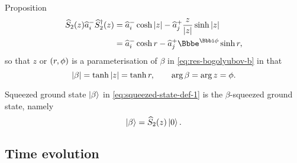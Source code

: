 \begin{namedthm}{Proposition}
\begin{align}
	\rfun{\widehat{S}_2}{z} \widehat{a}_i^- \rfun{\widehat{S}_2^\dagger}{z}
	&= \widehat{a}_i^-\cosh \vbr{z}
		- \widehat{a}_j^+ \frac{z}{\vbr{z}} \sinh \vbr{z}
	\nonumber \\
	&= \widehat{a}_i^-\cosh r - \widehat{a}_j^+ \ee^{\ii\phi} \sinh r,
\end{align}
so that $z$ or ${\left(r, \phi\right)}$ is a parameterisation of $\beta$ in 
\cref{eq:res-bogolyubov-b} in that
\begin{equation}
	{\left|\beta\right|} = \tanh{\left|z\right|} = \tanh r,\qquad \arg \beta = \arg z = \phi.
\end{equation}
\end{namedthm} %

\begin{namedthm}{Squeezed ground state}
	$\Ket{\beta}$ in \cref{eq:squeezed-state-def-1} is the $\beta$-squeezed 
ground state, namely
\begin{equation}
	\Ket{\beta} = {\widehat{S}_2}\mathopen{}\left(z\right)\mathclose{}\Ket{0}.
\end{equation}
\end{namedthm} %



\subsection{Time evolution}






